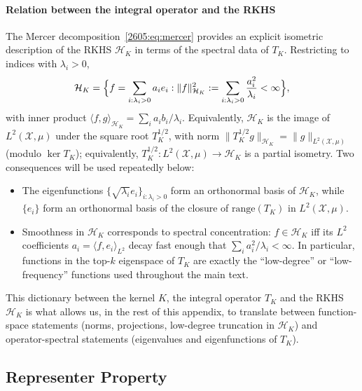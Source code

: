        \paragraph{Relation between the integral operator and the RKHS}
        The Mercer decomposition~\eqref{2605:eq:mercer} provides an explicit isometric description of the RKHS $\mathcal{H}_K$ in terms of the spectral data of $T_K$. Restricting to indices with $\lambda_i>0$,
        \begin{equation}\label{2605:eq:rkhs-mercer}
          \mathcal{H}_K = \Bigl\{ f=\sum_{i:\lambda_i>0}a_i e_i : \|f\|_{\mathcal{H}_K}^2 := \sum_{i:\lambda_i>0}\frac{a_i^2}{\lambda_i}<\infty \Bigr\},
          \end{equation}
          with inner product $\langle f,g\rangle_{\mathcal{H}_K}=\sum_i a_i b_i/\lambda_i$. Equivalently, $\mathcal{H}_K$ is the image of $L^2(\mathcal{X},\mu)$ under the square root $T_K^{1/2}$, with norm $\|T_K^{1/2}g\|_{\mathcal{H}_K}=\|g\|_{L^2(\mathcal{X},\mu)}$ (modulo $\ker T_K$); equivalently, $T_K^{1/2}:L^2(\mathcal{X},\mu)\to\mathcal{H}_K$ is a partial isometry. Two consequences will be used repeatedly below:
          \begin{itemize}
            \item The eigenfunctions $\{\sqrt{\lambda_i} e_i\}_{i:\lambda_i>0}$ form an orthonormal basis of $\mathcal{H}_K$, while $\{e_i\}$ form an orthonormal basis of the closure of $\mathrm{range}(T_K)$ in $L^2(\mathcal{X},\mu)$.
              \item Smoothness in $\mathcal{H}_K$ corresponds to spectral concentration: $f\in\mathcal{H}_K$ iff its $L^2$ coefficients $a_i=\langle f,e_i\rangle_{L^2}$ decay fast enough that $\sum_i a_i^2/\lambda_i<\infty$. In particular, functions in the top-$k$ eigenspace of $T_K$ are exactly the ``low-degree'' or ``low-frequency'' functions used throughout the main text.
              \end{itemize}
              This dictionary between the kernel $K$, the integral operator $T_K$ and the RKHS $\mathcal{H}_K$ is what allows us, in the rest of this appendix, to translate between function-space statements (norms, projections, low-degree truncation in $\mathcal{H}_K$) and operator-spectral statements (eigenvalues and eigenfunctions of $T_K$).
              
\subsection{Representer Property}

